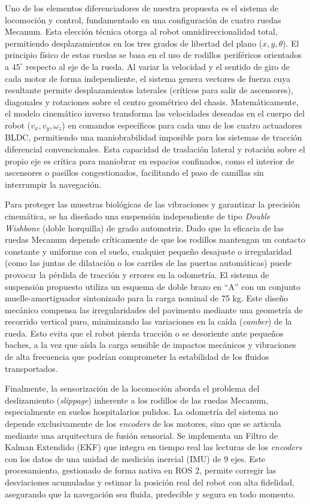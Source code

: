 Uno de los elementos diferenciadores de nuestra propuesta es el sistema de locomoción y control, fundamentado en una configuración de cuatro ruedas Mecanum. Esta elección técnica otorga al robot omnidireccionalidad total, permitiendo desplazamientos en los tres grados de libertad del plano ($x, y, \theta$). El principio físico de estas ruedas se basa en el uso de rodillos periféricos orientados a $45^{\circ}$ respecto al eje de la rueda. Al variar la velocidad y el sentido de giro de cada motor de forma independiente, el sistema genera vectores de fuerza cuya resultante permite desplazamientos laterales (críticos para salir de ascensores), diagonales y rotaciones sobre el centro geométrico del chasis. Matemáticamente, el modelo cinemático inverso transforma las velocidades deseadas en el cuerpo del robot ($v_x, v_y, \omega_z$) en comandos específicos para cada uno de los cuatro actuadores BLDC, permitiendo una maniobrabilidad imposible para los sistemas de tracción diferencial convencionales. Esta capacidad de traslación lateral y rotación sobre el propio eje es crítica para maniobrar en espacios confinados, como el interior de ascensores o pasillos congestionados, facilitando el paso de camillas sin interrumpir la navegación.

Para proteger las muestras biológicas de las vibraciones y garantizar la precisión cinemática, se ha diseñado una suspensión independiente de tipo \textit{Double Wishbone} (doble horquilla) de grado automotriz. Dado que la eficacia de las ruedas Mecanum depende críticamente de que los rodillos mantengan un contacto constante y uniforme con el suelo, cualquier pequeño desajuste o irregularidad (como las juntas de dilatación o los carriles de las puertas automáticas) puede provocar la pérdida de tracción y errores en la odometría. El sistema de suspensión propuesto utiliza un esquema de doble brazo en ``A'' con un conjunto muelle-amortiguador sintonizado para la carga nominal de 75 kg. Este diseño mecánico compensa las irregularidades del pavimento mediante una geometría de recorrido vertical puro, minimizando las variaciones en la caída (\textit{camber}) de la rueda. Esto evita que el robot pierda tracción o se desoriente ante pequeños baches, a la vez que aísla la carga sensible de impactos mecánicos y vibraciones de alta frecuencia que podrían comprometer la estabilidad de los fluidos transportados.

Finalmente, la sensorización de la locomoción aborda el problema del deslizamiento (\textit{slippage}) inherente a los rodillos de las ruedas Mecanum, especialmente en suelos hospitalarios pulidos. La odometría del sistema no depende exclusivamente de los \textit{encoders} de los motores, sino que se articula mediante una arquitectura de fusión sensorial. Se implementa un Filtro de Kalman Extendido (EKF) que integra en tiempo real las lecturas de los \textit{encoders} con los datos de una unidad de medición inercial (IMU) de 9 ejes. Este procesamiento, gestionado de forma nativa en ROS 2, permite corregir las desviaciones acumuladas y estimar la posición real del robot con alta fidelidad, asegurando que la navegación sea fluida, predecible y segura en todo momento.


